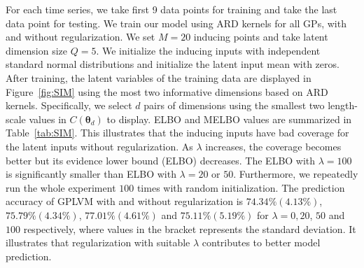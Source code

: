 \documentclass{article}
\begin{document}
For each time series, we take first 9 data points for training and 
take the last data point for testing. We train our model using ARD kernels for all GPs, with and without regularization. We set $M = 20$ inducing points and take latent dimension size $Q = 5$. We initialize the inducing inputs with independent standard normal distributions and initialize the latent input mean with zeros. After training, the latent variables of the training data are displayed in Figure~\ref{fig:SIM} using the most two informative dimensions based on ARD kernels. Specifically, we select $d$ pairs of dimensions using the smallest two length-scale values in $C(\bm\theta_d)$ to display. ELBO and MELBO values are summarized in Table~\ref{tab:SIM}. This illustrates that the inducing inputs have bad coverage for the latent inputs without regularization. As $\lambda$ increases, the coverage becomes better but its evidence lower bound (ELBO) decreases. The ELBO with $\lambda = 100$ is significantly smaller than ELBO with $\lambda = 20$ or $50$. Furthermore, we repeatedly run the whole experiment $100$ times with random initialization. The prediction accuracy of GPLVM with and without regularization is $74.34\%(4.13\%)$, $75.79\%(4.34\%)$, $77.01\%(4.61\%)$ and $75.11\%(5.19\%)$ for $\lambda = 0, 20$, $50$ and $100$ respectively, where values in the bracket represents the standard deviation. It illustrates that regularization with suitable $\lambda$ contributes to better model prediction. 
\end{document}

